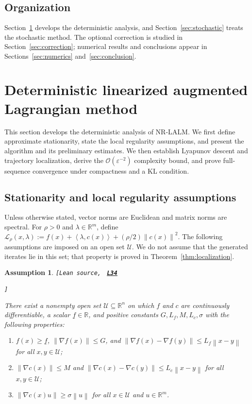 \documentclass[11pt]{article}
\newtheorem{assumption}[theorem]{Assumption}
\theoremstyle{definition}
\theoremstyle{remark}
\numberwithin{equation}{section}
\numberwithin{figure}{section}
\numberwithin{table}{section}
\numberwithin{algorithm}{section}
\newcommand{\R}{\mathbb{R}}
\newcommand{\cL}{\mathcal{L}}
\newcommand{\cO}{\mathcal{O}}
\newcommand{\norm}[1]{\left\lVert #1\right\rVert}
\newcommand{\ip}[2]{\left\langle #1,#2\right\rangle}
\newcommand{\grad}{\nabla}
\newcommand{\leanLinkText}[1]{%
  \underline{\textbf{#1}}%
}
\newcommand{\leanDeclTag}[2]{%
  {\footnotesize\texttt{[Lean source, }}%
  \href{https://github.com/optpku/ReasBook/blob/v4.32.2/ReasBook/Papers/TR_LALM_theory/#1?plain=1\#L#2}%
    {\leanLinkText{\footnotesize\texttt{L#2}}}%
}
\newcommand{\leanDeclTagEnd}{%
  \unskip
  {\footnotesize\texttt{]}}\enspace
}
\begin{document}
\subsection{Organization}

Section~\ref{sec:deterministic} develops the deterministic analysis, and Section~\ref{sec:stochastic} treats the stochastic method.  The optional correction is studied in Section~\ref{sec:correction}; numerical results and
conclusions appear in Sections~\ref{sec:numerics} and~\ref{sec:conclusion}.

\section{Deterministic linearized augmented Lagrangian method}
\label{sec:deterministic}

This section develops the deterministic analysis of NR-LALM.  We first define approximate stationarity, state the local regularity assumptions, and present the algorithm and its preliminary estimates.  We then establish Lyapunov descent and trajectory localization, derive the $\cO(\varepsilon^{-2})$ complexity bound, and prove full-sequence convergence under compactness and a KL condition.

\subsection{Stationarity and local regularity assumptions}

Unless otherwise stated, vector norms are Euclidean and matrix norms are spectral.  For $\rho>0$ and $\lambda\in\R^m$, define
$\cL_\rho(x,\lambda):=f(x)+\ip{\lambda}{c(x)} +(\rho/2)\norm{c(x)}^2$. The following assumptions are imposed on an open set \(\mathcal U\).  We do not assume that the generated iterates lie in this set; that property is proved in Theorem~\ref{thm:localization}.

\begin{assumption}
\label{ass:smooth}
\leanDeclTag{Assumption_2_1/Regularity.lean}{34}
\leanDeclTagEnd
There exist a nonempty open set $\mathcal U\subseteq\R^n$ on which \(f\) and
\(c\) are continuously differentiable, a scalar $\underline{f}\in\R$, and
positive constants $G,L_f,M,L_c,\sigma$ with the following properties:
\begin{enumerate}[label=\textup{(\roman*)},leftmargin=2.5em,itemsep=0.15em,topsep=0.25em]
\item \(f(x)\ge \underline{f}\), \(\norm{\grad f(x)}\le G\), and
      \(\norm{\grad f(x)-\grad f(y)}\le L_f\norm{x-y}\) for all
      \(x,y\in\mathcal U\);
\item \(\norm{\grad c(x)}\le M\) and
      \(\norm{\grad c(x)-\grad c(y)}\le L_c\norm{x-y}\) for all
      \(x,y\in\mathcal U\);
\item $\norm{\grad c(x)u}\ge\sigma\norm{u}$ for all
      $x\in\mathcal U$ and $u\in\R^m$.
\end{enumerate}
\end{assumption}
\end{document}
